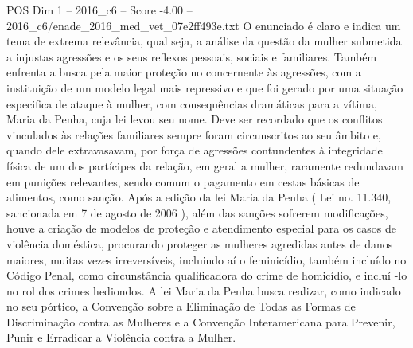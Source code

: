 \begin{textsample}{POS Dim 1 – 2016\_c6 – Score -4.00 – 2016\_c6/enade\_2016\_med\_vet\_07e2ff493e.txt}
O enunciado é claro e indica um tema de extrema relevância, qual seja, a análise da questão da mulher submetida a injustas agressões e os seus reflexos pessoais, sociais e familiares.
Também enfrenta a busca pela maior proteção no concernente às agressões, com a instituição de um modelo legal mais repressivo e que foi gerado por uma situação especifica de ataque à mulher, com consequências dramáticas para a vítima, Maria da Penha, cuja lei levou seu nome.
Deve ser recordado que os conflitos vinculados às relações familiares sempre foram circunscritos ao seu âmbito e, quando dele extravasavam, por força de agressões contundentes à integridade física de um dos partícipes da relação, em geral a mulher, raramente redundavam em punições relevantes, sendo comum o pagamento em cestas básicas de alimentos, como sanção.
Após a edição da lei Maria da Penha ( Lei no. 11.340, sancionada em 7 de agosto de 2006 ), além das sanções sofrerem modificações, houve a criação de modelos de proteção e atendimento especial para os casos de violência doméstica, procurando proteger as mulheres agredidas antes de danos maiores, muitas vezes irreversíveis, incluindo aí o feminicídio, também incluído no Código Penal, como circunstância qualificadora do crime de homicídio, e incluí -lo no rol dos crimes hediondos.
A lei Maria da Penha busca realizar, como indicado no seu pórtico, a Convenção sobre a Eliminação de Todas as Formas de Discriminação contra as Mulheres e a Convenção Interamericana para Prevenir, Punir e Erradicar a Violência contra a Mulher.

\end{textsample}
